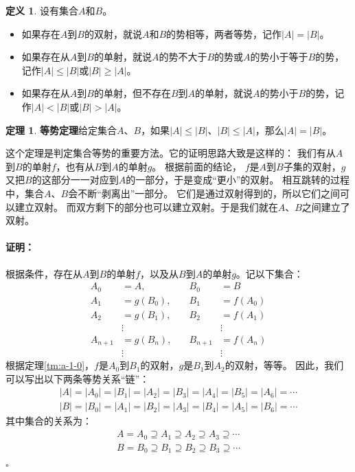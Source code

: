 \documentclass[12pt,UTF8]{ctexbook}
\theoremstyle{definition}
\newtheorem{df}{定义}[section]
\newtheorem{tm}{定理}[section]
\theoremstyle{plain}
\renewenvironment{proof}{\paragraph{\textbf{证明：}}}{\hfill$\square$}
\begin{document}
\begin{appendix}

\begin{df}\label{df:a-1-10}
    设有集合$A$和$B$。
    \begin{itemize}
        \item 如果存在$A$到$B$的双射，就说$A$和$B$的势相等，两者等势，记作$|A| = |B|$。
        \item 如果存在从$A$到$B$的单射，就说$A$的势不大于$B$的势或$A$的势小于等于$B$的势，记作$|A| \leqslant |B|$或$|B| \geqslant |A|$。
        \item 如果存在从$A$到$B$的单射，但不存在$B$到$A$的单射，就说$A$的势小于$B$的势，记作$|A| < |B|$或$|B| > |A|$。
    \end{itemize}
\end{df}

\begin{tm}{\textbf{等势定理}}\label{tm:a-1-10}
    给定集合$A$、$B$，如果$|A| \leqslant |B|$、$|B| \leqslant |A|$，那么$|A| = |B|$。
\end{tm}

这个定理是判定集合等势的重要方法。它的证明思路大致是这样的：
我们有从$A$到$B$的单射$f$，也有从$B$到$A$的单射$g$。
根据前面的结论，
$f$是$A$到$B$子集的双射，$g$又把$B$的这部分一一对应到$A$的一部分，于是变成“更小”的双射。
相互跳转的过程中，集合$A$、$B$会不断“剥离出”一部分。
它们是通过双射得到的，所以它们之间可以建立双射。
而双方剩下的部分也可以建立双射。于是我们就在$A$、$B$之间建立了双射。

\begin{proof}
    根据条件，存在从$A$到$B$的单射$f$，以及从$B$到$A$的单射$g$。记以下集合：
    $$
    \begin{array}{rlrl}
        A_0&= A, \quad & B_0 &= B \\
        A_1&= g(B_0), \quad & B_1 &= f(A_0) \\
        A_2&= g(B_1), \quad & B_2 &= f(A_1) \\
        &\vdots & &\vdots \\
        A_{n+1}&= g(B_n), \quad & B_{n+1} &= f(A_n) \\
        &\vdots & &\vdots
    \end{array}
    $$
    根据定理\ref{tm:a-1-0}，$f$是$A_0$到$B_1$的双射，$g$是$B_1$到$A_2$的双射，等等。
    因此，我们可以写出以下两条等势关系“链”：
    \begin{align*}
        |A| = |A_0| = |B_1| = |A_2| = |B_3| = |A_4| = |B_5| = |A_6| = \cdots  \\
        |B| = |B_0| = |A_1| = |B_2| = |A_3| = |B_4| = |A_5| = |B_6| = \cdots   
    \end{align*}
    其中集合的关系为：
    \begin{align*}
        A = A_0 \supseteq A_1 \supseteq A_2 \supseteq A_3  \supseteq \cdots  \\
        B = B_0 \supseteq B_1 \supseteq B_2 \supseteq B_3  \supseteq \cdots   
    \end{align*}
    

\end{proof}
\end{appendix}
\end{document}
